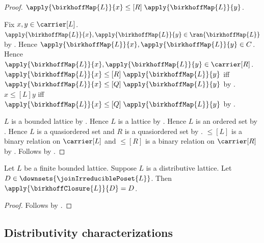 \begin{proof}
            $\apply{\birkhoffMap{L}}{x}
                \mathrel{\leq[R]}\apply{\birkhoffMap{L}}{y}$.
    \begin{subproof}
        Fix $x,y\in\carrier[L]$.
        $\apply{\birkhoffMap{L}}{x},\apply{\birkhoffMap{L}}{y}
            \in\ran{\birkhoffMap{L}}$ by .
        Hence $\apply{\birkhoffMap{L}}{x},
            \apply{\birkhoffMap{L}}{y}\in C$.
        Hence $\apply{\birkhoffMap{L}}{x},
            \apply{\birkhoffMap{L}}{y}\in\carrier[R]$.
        $\apply{\birkhoffMap{L}}{x}
            \mathrel{\leq[R]}\apply{\birkhoffMap{L}}{y}$ iff
            $\apply{\birkhoffMap{L}}{x}
                \mathrel{\leq[Q]}\apply{\birkhoffMap{L}}{y}$ by
            .
        $x\mathrel{\leq[L]}y$ iff
            $\apply{\birkhoffMap{L}}{x}
                \mathrel{\leq[Q]}\apply{\birkhoffMap{L}}{y}$ by
            .
    \end{subproof}
    $L$ is a bounded lattice by .
    Hence $L$ is a lattice by .
    Hence $L$ is an ordered set by .
    Hence $L$ is a quasiordered set and $R$ is a quasiordered set by
        .
    $\leq[L]$ is a binary relation on $\carrier[L]$ and
        $\leq[R]$ is a binary relation on $\carrier[R]$ by
        .
    Follows by .
\end{proof}

\begin{proposition}\label{birkhoff_closure_identity_of_distributive}
    Let $L$ be a finite bounded lattice.
    Suppose $L$ is a distributive lattice.
    Let $D\in\downsets{\joinIrreduciblePoset{L}}$.
    Then $\apply{\birkhoffClosure{L}}{D}=D$.
\end{proposition}
\begin{proof}
    Follows by .
\end{proof}

\subsection{Distributivity characterizations}


